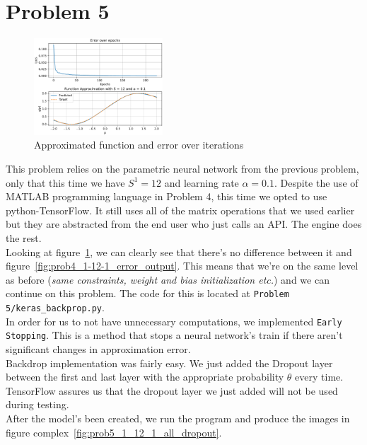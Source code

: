\section{Problem 5}

\begin{figure}
	\centering
	\includegraphics[width=0.43\textwidth]{../Problem 5/nn_1_12_1_nodp.pdf}
	\caption{Approximated function and error over iterations}
	\label{fig:prob5_1_12_1_nodp}
\end{figure}

This problem relies on the parametric neural network from the previous problem, only that this time we have $S^1=12$ and learning rate $\alpha=0.1$. Despite the use of MATLAB programming language in Problem 4, this time we opted to use python-TensorFlow. It still uses all of the matrix operations that we used earlier but they are abstracted from the end user who just calls an API. The engine does the rest.\\

Looking at figure~\ref{fig:prob5_1_12_1_nodp}, we can clearly see that there's no difference between it and figure~\ref{fig:prob4_1-12-1_error_output}. This means that we're on the same level as before (\textit{same constraints, weight and bias initialization etc.}) and we can continue on this problem.
The code for this is located at \verb|Problem 5/keras_backprop.py|.\\

In order for us to not have unnecessary computations, we implemented \verb|Early Stopping|. This is a method that stops a neural network's train if there aren't significant changes in approximation error.\\

Backdrop implementation was fairly easy. We just added the Dropout layer between the first and last layer with the appropriate probability $\theta$ every time. TensorFlow assures us that the dropout layer we just added will not be used during testing.\\
After the model's been created, we run the program and produce the images in figure complex~\ref{fig:prob5_1_12_1_all_dropout}.

